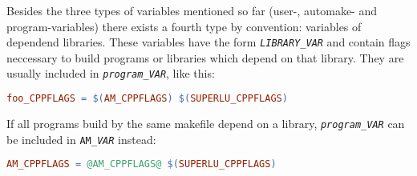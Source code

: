 \documentclass[11pt,a4paper,headinclude,footinclude,DIV16,normalheadings]{scrartcl}
\begin{document}
Besides the three types of variables mentioned so far (user-, automake- and
program-variables) there exists a fourth type by convention: variables of
dependend libraries.  These variables have the form
\texttt{\textit{LIBRARY}\_\textit{VAR}} and contain flags neccessary to build
programs or libraries which depend on that library.  They are usually included
in \texttt{\textit{program}\_\textit{VAR}}, like this:
\begin{lstlisting}[language=make]
foo_CPPFLAGS = $(AM_CPPFLAGS) $(SUPERLU_CPPFLAGS)
\end{lstlisting}
If all programs build by the same makefile depend on a library,
\texttt{\textit{program}\_\textit{VAR}} can be included in
\texttt{AM\_\textit{VAR}} instead:
\begin{lstlisting}[language=make]
AM_CPPFLAGS = @AM_CPPFLAGS@ $(SUPERLU_CPPFLAGS)
\end{lstlisting}
\end{document}
